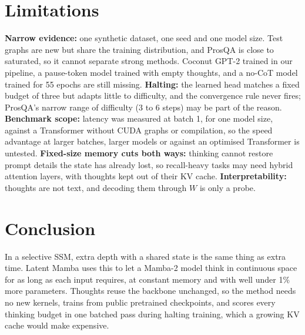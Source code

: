 \documentclass[10pt]{article}
\begin{document}
\section{Limitations}

\textbf{Narrow evidence:} one synthetic dataset, one seed and one model size. Test graphs are new but share the training distribution, and ProsQA is close to saturated, so it cannot separate strong methods. Coconut GPT-2 trained in our pipeline, a pause-token model trained with empty thoughts, and a no-CoT model trained for 55 epochs are still missing. \textbf{Halting:} the learned head matches a fixed budget of three but adapts little to difficulty, and the convergence rule never fires; ProsQA's narrow range of difficulty (3 to 6 steps) may be part of the reason. \textbf{Benchmark scope:} latency was measured at batch 1, for one model size, against a Transformer without CUDA graphs or compilation, so the speed advantage at larger batches, larger models or against an optimised Transformer is untested. \textbf{Fixed-size memory cuts both ways:} thinking cannot restore prompt details the state has already lost, so recall-heavy tasks may need hybrid attention layers, with thoughts kept out of their KV cache. \textbf{Interpretability:} thoughts are not text, and decoding them through $W$ is only a probe.

\section{Conclusion}

In a selective SSM, extra depth with a shared state is the same thing as extra time. Latent Mamba uses this to let a Mamba-2 model think in continuous space for as long as each input requires, at constant memory and with well under 1\% more parameters. Thoughts reuse the backbone unchanged, so the method needs no new kernels, trains from public pretrained checkpoints, and scores every thinking budget in one batched pass during halting training, which a growing KV cache would make expensive.
\end{document}
